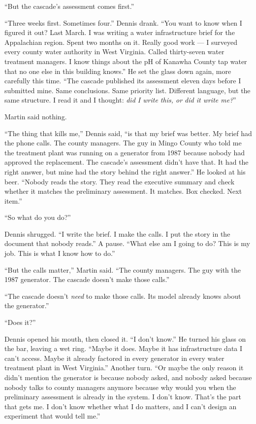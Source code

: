 \documentclass[11pt]{article}
\begin{document}
``But the cascade's assessment comes first.''

``Three weeks first. Sometimes four.'' Dennis drank. ``You want to know when I figured it out? Last March. I was writing a water infrastructure brief for the Appalachian region. Spent two months on it. Really good work --- I surveyed every county water authority in West Virginia. Called thirty-seven water treatment managers. I know things about the pH of Kanawha County tap water that no one else in this building knows.'' He set the glass down again, more carefully this time. ``The cascade published its assessment eleven days before I submitted mine. Same conclusions. Same priority list. Different language, but the same structure. I read it and I thought: \emph{did I write this, or did it write me?}''

Martin said nothing.

``The thing that kills me,'' Dennis said, ``is that my brief was better. My brief had the phone calls. The county managers. The guy in Mingo County who told me the treatment plant was running on a generator from 1987 because nobody had approved the replacement. The cascade's assessment didn't have that. It had the right answer, but mine had the story behind the right answer.'' He looked at his beer. ``Nobody reads the story. They read the executive summary and check whether it matches the preliminary assessment. It matches. Box checked. Next item.''

``So what do you do?''

Dennis shrugged. ``I write the brief. I make the calls. I put the story in the document that nobody reads.'' A pause. ``What else am I going to do? This is my job. This is what I know how to do.''

``But the calls matter,'' Martin said. ``The county managers. The guy with the 1987 generator. The cascade doesn't make those calls.''

``The cascade doesn't \emph{need} to make those calls. Its model already knows about the generator.''

``Does it?''

Dennis opened his mouth, then closed it. ``I don't know.'' He turned his glass on the bar, leaving a wet ring. ``Maybe it does. Maybe it has infrastructure data I can't access. Maybe it already factored in every generator in every water treatment plant in West Virginia.'' Another turn. ``Or maybe the only reason it didn't mention the generator is because nobody asked, and nobody asked because nobody talks to county managers anymore because why would you when the preliminary assessment is already in the system. I don't know. That's the part that gets me. I don't know whether what I do matters, and I can't design an experiment that would tell me.''
\end{document}
